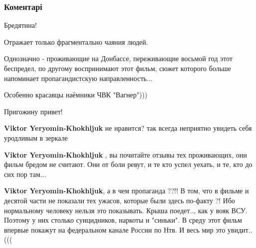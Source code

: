  
 
 
 
 
\subsubsection{Коментарі}
\label{sec:16_08_2021.fb.zharkih_denis.1.solncepek_film.cmt}

\begin{itemize}

 
Бредятина!

Отражает только фрагментально чаяния людей.

Однозначно - проживающие на Донбассе, переживающие восьмой год этот беспредел,
по другому воспринимают этот фильм, сюжет которого больше напоминает
пропагандистскую направленность...

Особенно красавцы наёмники ЧВК "Вагнер")))

Пригожину привет!

\begin{itemize}


\textbf{Viktor Yeryomin-Khokhljuk} не нравится? так всегда неприятно увидеть себя уродливым в зеркале

 
\textbf{Viktor Yeryomin-Khokhljuk} , вы почитайте отзывы тех проживающих, они
фильм бредом не считают. Они от боли ревут, и те кто успел уехать, и те, кто до
сих пор там...


\textbf{Viktor Yeryomin-Khokhljuk}, а в чем пропаганда ??!! В том, что в фильме
и десятой части не показали тех ужасов, которые были здесь по-факту ?! Ибо
нормальному человеку нельзя это показывать. Крыша поедет.., как у вояк ВСУ.
Поэтому у них столько суицидников, наркоты и "синьки". В среду этот фильм
впервые покажут на федеральном канале России по Нтв. И весь мир это увидит..
(((


\end{itemize}
\end{itemize}
